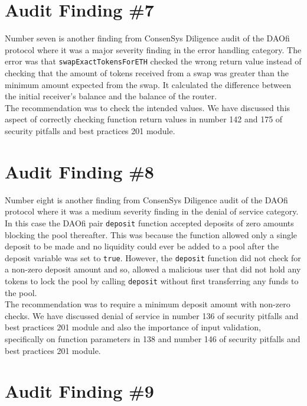 \section{Audit Finding \#7}

Number seven is another finding from ConsenSys Diligence audit of the DAOfi protocol where it was a major severity finding in the error handling category. The error was that \verb|swapExactTokensForETH| checked the wrong return value instead of checking that the amount of tokens received from a swap was greater than the minimum amount expected from the swap.
It calculated the difference between the initial receiver's balance and the balance of the router.\\

The recommendation was to check the intended values. We have discussed this aspect of correctly checking function return values in number 142 and 175 of security pitfalls and best practices 201 module.

\section{Audit Finding \#8}

Number eight is another finding from ConsenSys Diligence audit of the DAOfi protocol where it was a medium severity finding in the denial of service category. In this case the DAOfi pair \verb|deposit| function accepted deposits of zero amounts blocking the pool thereafter. This was because the function allowed only a single deposit to be made and no liquidity could ever be added to a pool after the deposit variable was set to \verb|true|. However, the \verb|deposit| function did not check for a non-zero deposit amount and so, allowed a malicious user that did not hold any tokens to lock the pool by calling \verb|deposit| without first transferring any funds to the pool.\\

The recommendation was to require a minimum deposit amount with non-zero checks. We have discussed denial of service in number 136 of security pitfalls and best practices 201 module and also the importance of input validation, specifically on function parameters in 138 and number 146 of security pitfalls and best practices 201 module.

\section{Audit Finding \#9}

